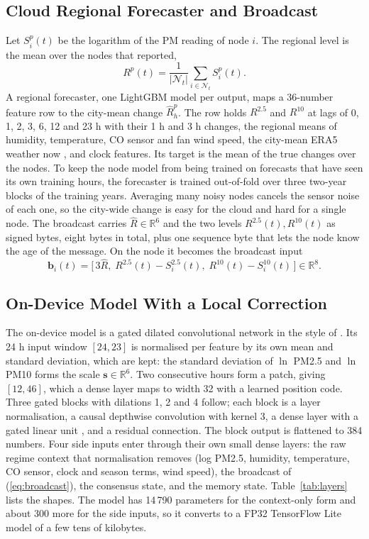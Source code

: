 \documentclass[journal]{IEEEtran}
\begin{document}
\subsection{Cloud Regional Forecaster and Broadcast}
Let $S^p_i(t)$ be the logarithm of the PM reading of node $i$. The regional level is the mean over the nodes that reported,
\begin{equation}
R^p(t) = \frac{1}{|\mathcal{N}_t|}\sum_{i\in\mathcal{N}_t} S^p_i(t).
\label{eq:region}
\end{equation}
A regional forecaster, one LightGBM model \cite{ke2017lightgbm} per output, maps a 36-number feature row to the city-mean change $\hat R_{h}^p$. The row holds $R^{2.5}$ and $R^{10}$ at lags of 0, 1, 2, 3, 6, 12 and 23 h with their 1 h and 3 h changes, the regional means of humidity, temperature, CO sensor and fan wind speed, the city-mean ERA5 weather now \cite{hersbach2020era5}, and clock features. Its target is the mean of the true changes over the nodes. To keep the node model from being trained on forecasts that have seen its own training hours, the forecaster is trained out-of-fold over three two-year blocks of the training years. Averaging many noisy nodes cancels the sensor noise of each one, so the city-wide change is easy for the cloud and hard for a single node. The broadcast carries $\hat R \in \mathbb{R}^6$ and the two levels $R^{2.5}(t), R^{10}(t)$ as signed bytes, eight bytes in total, plus one sequence byte that lets the node know the age of the message. On the node it becomes the broadcast input
\begin{equation}
\mathbf{b}_i(t) = \big[\,3\hat R,\; R^{2.5}(t)-S^{2.5}_i(t),\; R^{10}(t)-S^{10}_i(t)\,\big]\in\mathbb{R}^{8}.
\label{eq:broadcast}
\end{equation}

\subsection{On-Device Model With a Local Correction}
The on-device model is a gated dilated convolutional network in the style of \cite{na2026privileged}. Its 24 h input window $[24, 23]$ is normalised per feature by its own mean and standard deviation, which are kept: the standard deviation of $\ln$ PM2.5 and $\ln$ PM10 forms the scale $\mathbf{s}\in\mathbb{R}^6$. Two consecutive hours form a patch, giving $[12, 46]$, which a dense layer maps to width 32 with a learned position code. Three gated blocks with dilations 1, 2 and 4 follow; each block is a layer normalisation, a causal depthwise convolution with kernel 3, a dense layer with a gated linear unit \cite{dauphin2017glu}, and a residual connection. The block output is flattened to 384 numbers. Four side inputs enter through their own small dense layers: the raw regime context that normalisation removes (log PM2.5, humidity, temperature, CO sensor, clock and season terms, wind speed), the broadcast of (\ref{eq:broadcast}), the consensus state, and the memory state. Table~\ref{tab:layers} lists the shapes. The model has 14\,790 parameters for the context-only form and about 300 more for the side inputs, so it converts to a FP32 TensorFlow Lite model of a few tens of kilobytes.
\end{document}
